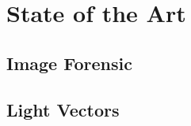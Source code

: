 \section{State of the Art} \label{sec:StateOfTheArt}


\subsection{Image Forensic}\label{sec:imageForensic}

\subsection{Light Vectors}\label{sec:lightVecs}



\newpage
